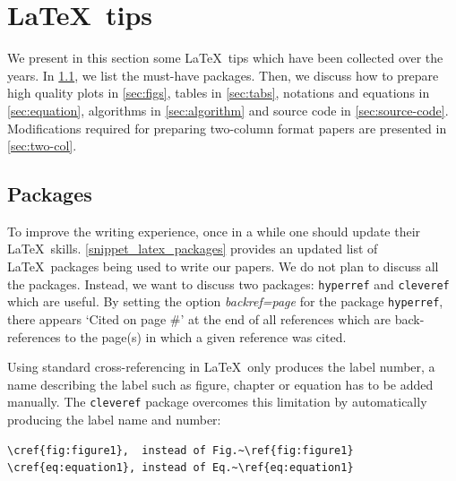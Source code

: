 \documentclass[authoryear,3p,times,preprint,review,fleqn]{elsarticle}
\numberwithin{equation}{section}
\theoremstyle{remark}
\begin{document}
\section{\LaTeX\ tips}\label{sec:latex}

We present in this section some \LaTeX\ tips which have been collected over the years. In \cref{sec:packages}, we list the must-have packages. Then, we discuss how to prepare high quality plots in \cref{sec:figs}, tables in 
\cref{sec:tabs},  notations and equations in \cref{sec:equation}, algorithms in \cref{sec:algorithm} and source code in \cref{sec:source-code}. Modifications required for preparing two-column format papers are presented in \cref{sec:two-col}.

\subsection{Packages}\label{sec:packages}


To improve the writing experience, once in a while one should update their \LaTeX\ skills. \cref{snippet_latex_packages} provides an updated list of \LaTeX\ packages being used to write our papers.
We do not plan to discuss all the packages. Instead, we want to discuss two packages: \texttt{hyperref} and \texttt{cleveref} which are useful.
By setting the option \textit{backref=page} for the package \texttt{hyperref}, there appears `Cited on page \#' at the end of all references which are back-references  to the page(s)  in which a given reference was cited.


Using standard cross-referencing in \LaTeX\ only produces the label number, a name describing the label such as figure, chapter or equation has to be added manually. The \texttt{cleveref} package overcomes this limitation by automatically producing the label name and number:

\begin{verbatim}
\cref{fig:figure1},  instead of Fig.~\ref{fig:figure1}
\cref{eq:equation1}, instead of Eq.~\ref{eq:equation1}
\end{verbatim}
\end{document}
